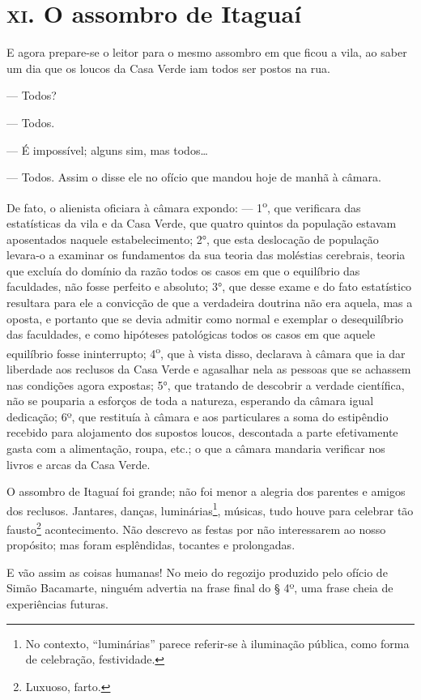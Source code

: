 \chapter{\textsc{xi}. O assombro de Itaguaí}

E agora prepare-se o leitor para o mesmo assombro em que ficou a vila,
ao saber um dia que os loucos da Casa Verde iam todos ser postos na rua.

--- Todos?

--- Todos.

--- É impossível; alguns sim, mas todos\ldots{}

--- Todos. Assim o disse ele no ofício que mandou hoje de manhã à
câmara.

De fato, o alienista oficiara à câmara expondo: ---
1\textsuperscript{o}, que verificara das estatísticas da vila e da Casa
Verde, que quatro quintos da população estavam aposentados naquele
estabelecimento; 2°, que esta deslocação de população levara-o a
examinar os fundamentos da sua teoria das moléstias cerebrais, teoria
que excluía do domínio da razão todos os casos em que o equilíbrio das
faculdades, não fosse perfeito e absoluto; 3°, que desse exame e do fato
estatístico resultara para ele a convicção de que a verdadeira doutrina
não era aquela, mas a oposta, e portanto que se devia admitir como
normal e exemplar o desequilíbrio das faculdades, e como hipóteses
patológicas todos os casos em que aquele equilíbrio fosse ininterrupto;
4\textsuperscript{o}, que à vista disso, declarava à câmara que ia dar
liberdade aos reclusos da Casa Verde e agasalhar nela as pessoas que se
achassem nas condições agora expostas; 5°, que tratando de descobrir a
verdade científica, não se pouparia a esforços de toda a natureza,
esperando da câmara igual dedicação; 6º, que restituía à câmara e aos
particulares a soma do estipêndio recebido para alojamento dos supostos
loucos, descontada a parte efetivamente gasta com a alimentação, roupa,
etc.; o que a câmara mandaria verificar nos livros e arcas da Casa
Verde.

O assombro de Itaguaí foi grande; não foi menor a alegria dos parentes e
amigos dos reclusos. Jantares, danças, luminárias\footnote{No contexto,
  ``luminárias'' parece referir-se à iluminação pública, como forma de
  celebração, festividade.}, músicas, tudo houve para celebrar tão
fausto\footnote{Luxuoso, farto.} acontecimento. Não descrevo as festas
por não interessarem ao nosso propósito; mas foram esplêndidas, tocantes
e prolongadas.

E vão assim as coisas humanas! No meio do regozijo produzido pelo ofício
de Simão Bacamarte, ninguém advertia na frase final do § 4º, uma frase
cheia de experiências futuras.

